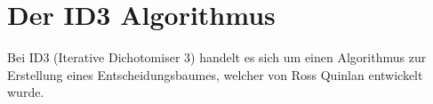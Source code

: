 \chapter{Der ID3 Algorithmus}
\label{id3}
Bei ID3 (Iterative Dichotomiser 3) handelt es sich um einen Algorithmus zur Erstellung eines Entscheidungsbaumes, welcher von Ross Quinlan entwickelt wurde. \Autocite{QuinlanID3}




